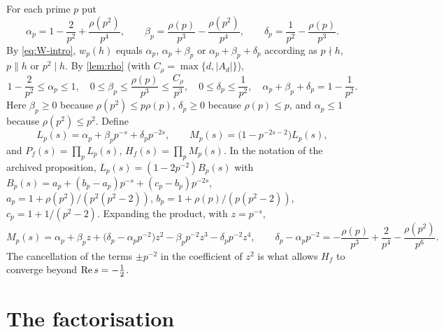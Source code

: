 For each prime $p$ put
\begin{equation}\label{eq:abd}
\alpha_p=1-\frac2{p^2}+\frac{\rho(p^2)}{p^4},\qquad
\beta_p=\frac{\rho(p)}{p^3}-\frac{\rho(p^2)}{p^4},\qquad
\delta_p=\frac1{p^2}-\frac{\rho(p)}{p^3}.
\end{equation}
By \eqref{eq:W-intro}, $w_p(h)$ equals $\alpha_p$, $\alpha_p+\beta_p$ or $\alpha_p+\beta_p+\delta_p$ according as $p\nmid h$, $p\parallel h$ or $p^2\mid h$. By \cref{lem:rho} (with $C_\rho=\max\{d,|A_d|\}$),
\begin{equation}\label{eq:abd-bounds}
1-\frac2{p^2}\le\alpha_p\le1,\quad0\le\beta_p\le\frac{\rho(p)}{p^3}\le\frac{C_\rho}{p^3},\quad0\le\delta_p\le\frac1{p^2},\quad\alpha_p+\beta_p+\delta_p=1-\frac1{p^2}.
\end{equation}
Here $\beta_p\ge0$ because $\rho(p^2)\le p\rho(p)$, $\delta_p\ge0$ because $\rho(p)\le p$, and $\alpha_p\le1$ because $\rho(p^2)\le p^2$. Define
\begin{equation}\label{eq:LM}
L_p(s)=\alpha_p+\beta_pp^{-s}+\delta_pp^{-2s},\qquad
M_p(s)=\bigl(1-p^{-2s-2}\bigr)L_p(s),
\end{equation}
and $P_f(s)=\prod_pL_p(s)$, $H_f(s)=\prod_pM_p(s)$. In the notation of the archived proposition, $L_p(s)=(1-2p^{-2})B_p(s)$ with $B_p(s)=a_p+(b_p-a_p)p^{-s}+(c_p-b_p)p^{-2s}$, $a_p=1+\rho(p^2)/(p^2(p^2-2))$, $b_p=1+\rho(p)/(p(p^2-2))$, $c_p=1+1/(p^2-2)$. Expanding the product, with $z=p^{-s}$,
\begin{equation}\label{eq:M-expand}
M_p(s)=\alpha_p+\beta_pz+\bigl(\delta_p-\alpha_pp^{-2}\bigr)z^2-\beta_pp^{-2}z^3-\delta_pp^{-2}z^4,\qquad
\delta_p-\alpha_pp^{-2}=-\frac{\rho(p)}{p^3}+\frac2{p^4}-\frac{\rho(p^2)}{p^6}.
\end{equation}
The cancellation of the terms $\pm p^{-2}$ in the coefficient of $z^2$ is what allows $H_f$ to converge beyond $\operatorname{Re} s=-\frac12$.

\section{The factorisation}

